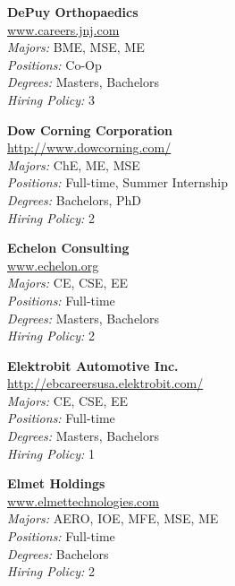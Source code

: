 \documentclass[twoside]{article}
\begin{document}
\begin{center}
\begin{multicols}{3}
\begin{minipage}{.9\columnwidth}{\Large\bf DePuy Orthopaedics }\\
	\url{www.careers.jnj.com}\\
	\emph{Majors:} BME, MSE, ME\\
	\emph{Positions:} Co-Op\\
	\emph{Degrees:} Masters, Bachelors\\
	\emph{Hiring Policy:} 3\\
\end{minipage}
 
\begin{minipage}{.9\columnwidth}{\Large\bf Dow Corning Corporation }\\
	\url{http://www.dowcorning.com/}\\
	\emph{Majors:} ChE, ME, MSE\\
	\emph{Positions:} Full-time, Summer Internship\\
	\emph{Degrees:} Bachelors, PhD\\
	\emph{Hiring Policy:} 2\\
\end{minipage}
 
\begin{minipage}{.9\columnwidth}{\Large\bf Echelon Consulting }\\
	\url{www.echelon.org}\\
	\emph{Majors:} CE, CSE, EE\\
	\emph{Positions:} Full-time\\
	\emph{Degrees:} Masters, Bachelors\\
	\emph{Hiring Policy:} 2\\
\end{minipage}
 
\begin{minipage}{.9\columnwidth}{\Large\bf Elektrobit Automotive Inc. }\\
	\url{http://ebcareersusa.elektrobit.com/}\\
	\emph{Majors:} CE, CSE, EE\\
	\emph{Positions:} Full-time\\
	\emph{Degrees:} Masters, Bachelors\\
	\emph{Hiring Policy:} 1\\
\end{minipage}
 
\begin{minipage}{.9\columnwidth}{\Large\bf Elmet Holdings }\\
	\url{www.elmettechnologies.com}\\
	\emph{Majors:} AERO, IOE, MFE, MSE, ME\\
	\emph{Positions:} Full-time\\
	\emph{Degrees:} Bachelors\\
	\emph{Hiring Policy:} 2\\
\end{minipage}
 

\end{multicols}
\end{center}
\end{document}
